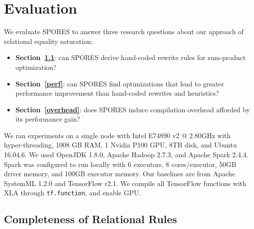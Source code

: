 \section{Evaluation} \label{sec:evaluation}

We evaluate SPORES to answer three research questions about our
approach of relational equality saturation: 
\begin{itemize}
    \item \textbf{Section~\ref{relcomp}}: can SPORES derive hand-coded
      rewrite rules for sum-product optimization?
    \item \textbf{Section~\ref{perf}}: can SPORES find optimizations that
      lead to greater performance improvement than hand-coded rewrites and
      heuristics? 
      \item \textbf{Section~\ref{overhead}}: does SPORES induce compilation overhead afforded by its performance gain?  
\end{itemize}

We ran experiments on a single node with Intel E74890 v2 @ 2.80GHz with hyper-threading, 
1008 GB RAM, 1 Nvidia P100 GPU, 8TB
disk, and Ubuntu 16.04.6. We used OpenJDK 1.8.0, Apache Hadoop 2.7.3, and Apache
Spark 2.4.4. Spark was configured to run locally with 6 executors, 8
cores/executor, 50GB driver memory, and 100GB executor memory. Our baselines are
from Apache SystemML 1.2.0 and TensorFlow r2.1. We compile all TensorFlow functions
with XLA through \verb|tf.function|, and enable GPU.  

\subsection{Completeness of Relational Rules} \label{relcomp}

